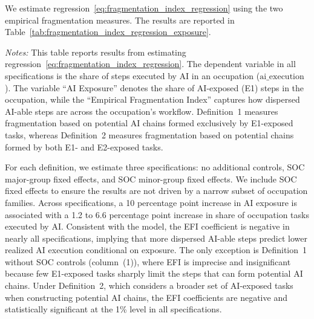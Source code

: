 We estimate regression~\eqref{eq:fragmentation_index_regression} using the two empirical fragmentation measures.
The results are reported in Table~\ref{tab:fragmentation_index_regression_exposure}.  
\begin{table}[t!]
    \caption{Role of AI-able Task Fragmentation in Determining AI Execution Outcomes}
    \label{tab:fragmentation_index_regression_exposure}
    \begin{center}
    
    \end{center}
    \raggedright \footnotesize{\emph{Notes:}} This table reports results from estimating regression~\eqref{eq:fragmentation_index_regression}.
    The dependent variable in all specifications is the share of steps executed by AI in an occupation ($\text{ai\_execution}$).
    The variable ``AI Exposure'' denotes the share of AI-exposed (E1) steps in the occupation, while the ``Empirical Fragmentation Index'' captures how dispersed AI-able steps are across the occupation's workflow.
    Definition~1 measures fragmentation based on potential AI chains formed exclusively by E1-exposed tasks, whereas Definition~2 measures fragmentation based on potential chains formed by both E1- and E2-exposed tasks.
\end{table}
For each definition, we estimate three specifications: no additional controls, SOC major-group fixed effects, and SOC minor-group fixed effects.  
We include SOC fixed effects to ensure the results are not driven by a narrow subset of occupation families.    
Across specifications, a 10 percentage point increase in AI exposure is associated with a 1.2 to 6.6 percentage point increase in share of occupation tasks executed by AI.  
Consistent with the model, the EFI coefficient is negative in nearly all specifications, implying that more dispersed AI-able steps predict lower realized AI execution conditional on exposure.  
The only exception is Definition~1 without SOC controls (column~(1)), where EFI is imprecise and insignificant because few E1-exposed tasks sharply limit the steps that can form potential AI chains.  
Under Definition~2, which considers a broader set of AI-exposed tasks when constructing potential AI chains, the EFI coefficients are negative and statistically significant at the 1\% level in all specifications.

